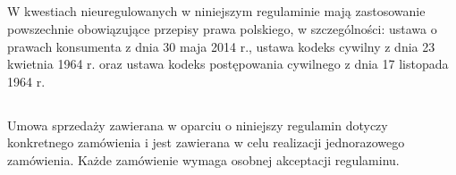 
		\subsection{} W kwestiach nieuregulowanych w niniejszym regulaminie mają zastosowanie powszechnie obowiązujące przepisy prawa polskiego, w szczególności: ustawa o prawach konsumenta z dnia 30 maja 2014 r., ustawa kodeks cywilny z dnia 23 kwietnia 1964 r. oraz ustawa kodeks postępowania cywilnego z dnia 17 listopada 1964 r.

		\subsection{} Umowa sprzedaży zawierana w oparciu o niniejszy regulamin dotyczy konkretnego zamówienia i jest zawierana w celu realizacji jednorazowego zamówienia. Każde zamówienie wymaga osobnej akceptacji regulaminu. 
